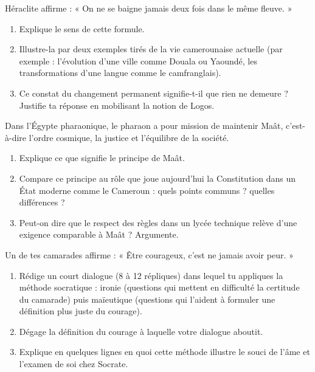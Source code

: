 \documentclass[11pt]{article}
\newcommand{\cle}[1]{{\popxbold\color{popdark}#1}}
\newcounter{popsec}
\newcounter{popsub}
\newcommand{\courssub}[1]{%
  \stepcounter{popsub}%
  \par\vspace{9pt}\noindent{\popxbold\fontsize{11.5}{13}\selectfont\color{popink}{\color{poporange}\thepopsec.\thepopsub}\hspace{6pt}#1}\par\nopagebreak\vspace{4pt}
}
\begin{document}
\courssub{Je m'entraîne}

\begin{exercice}
Héraclite affirme : « On ne se baigne jamais deux fois dans le même fleuve. »
\begin{enumerate}
\item Explique le sens de cette formule.
\item Illustre-la par deux exemples tirés de la vie camerounaise actuelle (par exemple : l'évolution d'une ville comme Douala ou Yaoundé, les transformations d'une langue comme le camfranglais).
\item Ce constat du changement permanent signifie-t-il que rien ne demeure ? Justifie ta réponse en mobilisant la notion de \cle{Logos}.
\end{enumerate}
\end{exercice}

\begin{exercice}
Dans l'Égypte pharaonique, le pharaon a pour mission de maintenir \cle{Maât}, c'est-à-dire l'ordre cosmique, la justice et l'équilibre de la société.
\begin{enumerate}
\item Explique ce que signifie le principe de Maât.
\item Compare ce principe au rôle que joue aujourd'hui la Constitution dans un État moderne comme le Cameroun : quels points communs ? quelles différences ?
\item Peut-on dire que le respect des règles dans un lycée technique relève d'une exigence comparable à Maât ? Argumente.
\end{enumerate}
\end{exercice}

\begin{exercice}
Un de tes camarades affirme : « Être courageux, c'est ne jamais avoir peur. »
\begin{enumerate}
\item Rédige un court dialogue (8 à 12 répliques) dans lequel tu appliques la méthode socratique : \cle{ironie} (questions qui mettent en difficulté la certitude du camarade) puis \cle{maïeutique} (questions qui l'aident à formuler une définition plus juste du courage).
\item Dégage la définition du courage à laquelle votre dialogue aboutit.
\item Explique en quelques lignes en quoi cette méthode illustre le souci de l'âme et l'examen de soi chez Socrate.
\end{enumerate}
\end{exercice}
\end{document}
